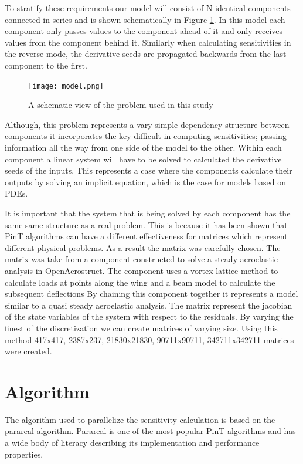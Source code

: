 \documentclass[conf]{new-aiaa}
\begin{document}
To stratify these requirements our model will consist of N identical components connected in series and is shown schematically in Figure \ref{fig:model}.
In this model each component only passes values to the component ahead of it and only receives values from the component behind it.
Similarly when calculating sensitivities in the reverse mode, the derivative seeds are propagated backwards from the last component to the first.

\begin{figure}[H]
	\centering
	\texttt{[image: model.png]}
	\caption{A schematic view of the problem used in this study}
	\label{fig:model}
\end{figure}


Although, this problem represents a vary simple dependency structure between components it incorporates the key difficult in computing sensitivities; passing information all the way from one side of the model to the other.
Within each component a linear system will have to be solved to calculated the derivative seeds of the inputs.
This represents a case where the components calculate their outputs by solving an implicit equation, which is the case for models based on PDEs.

It is important that the system that is being solved by each component has the same same structure as a real problem.
This is because it has been shown that PinT algorithms can have a different effectiveness for matrices which represent different physical problems.
As a result the matrix was carefully chosen.
The matrix was take from a component constructed to solve a steady aeroelastic analysis in OpenAerostruct.
The component uses a vortex lattice method to calculate loads at points along the wing and a beam model to calculate the subsequent deflections
By chaining this component together it represents a model similar to a quasi steady aeroelastic analysis.
The matrix represent the jacobian of the state variables of the system with respect to the residuals.
By varying the finest of the discretization we can create matrices of varying size.
Using this method 417x417, 2387x237, 21830x21830, 90711x90711, 342711x342711 matrices were created.




\section{Algorithm}

The algorithm used to parallelize the sensitivity calculation is based on the parareal algorithm.
Parareal is one of the most popular PinT algorithms and has a wide body of literacy describing its implementation and performance properties.
\end{document}
